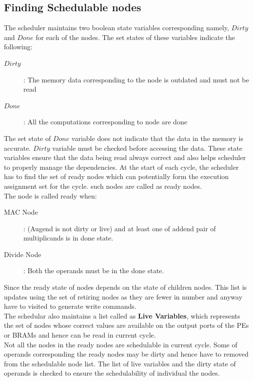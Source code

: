 \subsection{Finding Schedulable nodes}
The scheduler maintains two boolean state variables corresponding namely, $Dirty$ and $Done$ for each of the nodes. 
The set states of these variables indicate the following:
\begin{description}
    \item[$Dirty$]: The memory data corresponding to the node is outdated and must not be read
    \item[$Done$]: All the computations corresponding to node are done
\end{description}
The set state of $Done$ variable does not indicate that the data in the memory is accurate. $Dirty$ variable must be 
checked before accessing the data. These state variables ensure that the data being read always correct and also 
helps scheduler to properly manage the dependencies. At the start of each cycle, the scheduler 
has to find the set of ready nodes which can potentially form the execution assignment set for the cycle. such nodes 
are called as ready nodes.\\
The node is called ready when:
\begin{description}
    \item[MAC Node]: (Augend is not dirty or live) and at least one of addend pair of multiplicands is in done state.
    \item[Divide Node]: Both the operands must be in the done state. 
\end{description}
Since the ready state of nodes depends on the state of children nodes. This list is updates using the set 
of retiring nodes as they are fewer in number and anyway have to visited to generate write commands. \\

The schedular also maintains a list called as \textbf{Live Variables}, which represents the set of 
nodes whose correct values are available on the output ports of the PEs or BRAMs and hence can be 
read in current cycle. \\

Not all the nodes in the ready nodes are schedulable in current cycle. Some of operands 
corresponding the ready nodes may be dirty and hence have to removed from the 
schedulable node list. The list of live variables and the dirty state of operands is checked to
ensure the schedulability of individual the nodes. 


